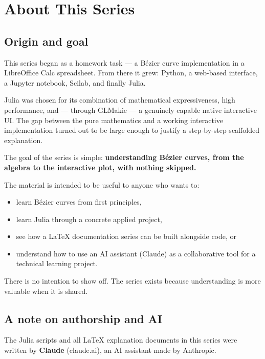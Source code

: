 \documentclass[12pt, a4paper]{article}
\begin{document}
\section{About This Series}

\subsection{Origin and goal}

This series began as a homework task --- a B\'ezier curve
implementation in a LibreOffice Calc spreadsheet.
From there it grew: Python, a web-based interface, a
Jupyter notebook, Scilab, and finally Julia.

Julia was chosen for its combination of mathematical
expressiveness, high performance, and --- through GLMakie
--- a genuinely capable native interactive UI.
The gap between the pure mathematics and a working
interactive implementation turned out to be large enough
to justify a step-by-step scaffolded explanation.

The goal of the series is simple:
\textbf{understanding B\'ezier curves, from the algebra
to the interactive plot, with nothing skipped.}

The material is intended to be useful to anyone who wants to:
\begin{itemize}
  \item learn B\'ezier curves from first principles,
  \item learn Julia through a concrete applied project,
  \item see how a LaTeX documentation series can be built
        alongside code, or
  \item understand how to use an AI assistant (Claude)
        as a collaborative tool for a technical learning project.
\end{itemize}

There is no intention to show off.
The series exists because understanding is more valuable
when it is shared.

\subsection{A note on authorship and AI}

The Julia scripts and all \LaTeX{} explanation documents in
this series were written by \textbf{Claude} (claude.ai),
an AI assistant made by Anthropic.
\end{document}
